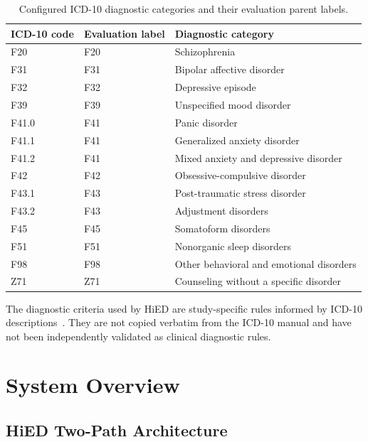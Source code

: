 \documentclass[12pt,a4paper,oneside]{report}
\begin{document}
\begin{table}[htbp]
\centering
\caption{Configured ICD-10 diagnostic categories and their evaluation
parent labels.}
\label{tab:configured-profile-summary}
\small
\begin{tabularx}{\textwidth}{|p{3.0cm}|p{2.2cm}|X|}
\hline
\textbf{ICD-10 code} & \textbf{Evaluation label} &
\textbf{Diagnostic category}\\
\hline
F20 & F20 & Schizophrenia\\
\hline
F31 & F31 & Bipolar affective disorder\\
\hline
F32 & F32 & Depressive episode\\
\hline
F39 & F39 & Unspecified mood disorder\\
\hline
F41.0 & F41 & Panic disorder\\
\hline
F41.1 & F41 & Generalized anxiety disorder\\
\hline
F41.2 & F41 & Mixed anxiety and depressive disorder\\
\hline
F42 & F42 & Obsessive-compulsive disorder\\
\hline
F43.1 & F43 & Post-traumatic stress disorder\\
\hline
F43.2 & F43 & Adjustment disorders\\
\hline
F45 & F45 & Somatoform disorders\\
\hline
F51 & F51 & Nonorganic sleep disorders\\
\hline
F98 & F98 & Other behavioral and emotional disorders\\
\hline
Z71 & Z71 & Counseling without a specific disorder\\
\hline
\end{tabularx}
\end{table}

The diagnostic criteria used by HiED are study-specific rules informed
by ICD-10 descriptions~\citep{who2019icd10}. They are not copied
verbatim from the ICD-10 manual and have not been independently
validated as clinical diagnostic rules.

\section{System Overview}
\label{sec:compared-architectures}

\subsection{HiED Two-Path Architecture}
\label{sec:hied-two-path-architecture}
\end{document}
